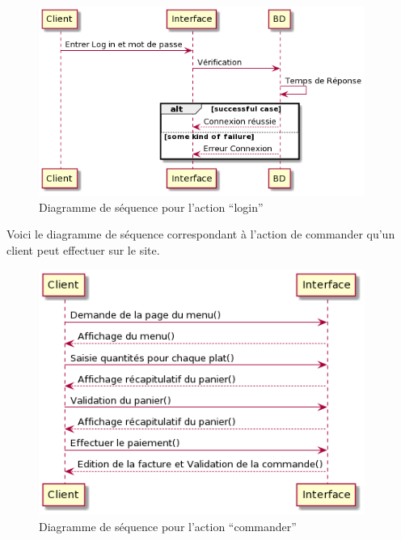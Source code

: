 \begin{figure}[H]
\begin{centering}
\includegraphics[width=0.95\textwidth,height=0.6\textheight]{Ressources/Login.png}
\caption{Diagramme de séquence pour l'action ``login''}
\par
\end{centering}
\end{figure}

\clearpage

Voici le diagramme de séquence correspondant à l'action de commander qu'un client peut effectuer sur le site.

\begin{figure}[H]
\begin{centering}
\includegraphics[width=0.95\textwidth,height=0.6\textheight]{Ressources/Commander.png}
\caption{Diagramme de séquence pour l'action ``commander''}
\par
\end{centering}
\end{figure}

